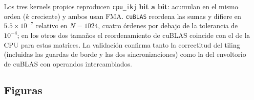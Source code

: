 	Los tres kernels propios reproducen \texttt{cpu\_ikj} \textbf{bit a bit}: acumulan en el mismo orden ($k$ creciente) y ambos usan FMA. \texttt{cuBLAS} reordena las sumas y difiere en $5.5 \times 10^{-7}$ relativo en $N = 1024$, cuatro órdenes por debajo de la tolerancia de $10^{-4}$; en los otros dos tamaños el reordenamiento de cuBLAS coincide con el de la CPU para estas matrices. La validación confirma tanto la correctitud del tiling (incluidas las guardas de borde y las dos sincronizaciones) como la del envoltorio de cuBLAS con operandos intercambiados.

\subsection{Figuras}




